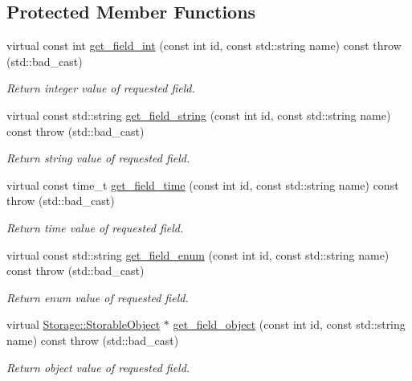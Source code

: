 \subsection*{Protected Member Functions}
\begin{DoxyCompactItemize}
\item 
virtual const int \hyperlink{classDummyStorage_a275263eba82a652005292f01a120af8e}{get\_\-field\_\-int} (const int id, const std::string name) const   throw (std::bad\_\-cast)
\begin{DoxyCompactList}\small\item\em Return integer value of requested field. \item\end{DoxyCompactList}\item 
virtual const std::string \hyperlink{classDummyStorage_a410ef9d239193e25f830c49140e18293}{get\_\-field\_\-string} (const int id, const std::string name) const   throw (std::bad\_\-cast)
\begin{DoxyCompactList}\small\item\em Return string value of requested field. \item\end{DoxyCompactList}\item 
virtual const time\_\-t \hyperlink{classDummyStorage_a978ef9d688175e3739bb478f4c9b5313}{get\_\-field\_\-time} (const int id, const std::string name) const   throw (std::bad\_\-cast)
\begin{DoxyCompactList}\small\item\em Return time value of requested field. \item\end{DoxyCompactList}\item 
virtual const std::string \hyperlink{classDummyStorage_a1101739c23fbf79b009558553180ef1a}{get\_\-field\_\-enum} (const int id, const std::string name) const   throw (std::bad\_\-cast)
\begin{DoxyCompactList}\small\item\em Return enum value of requested field. \item\end{DoxyCompactList}\item 
virtual \hyperlink{classStorage_1_1StorableObject}{Storage::StorableObject} $\ast$ \hyperlink{classDummyStorage_a7135d171d9b83c2fbf72851fa9ea852a}{get\_\-field\_\-object} (const int id, const std::string name) const   throw (std::bad\_\-cast)
\begin{DoxyCompactList}\small\item\em Return object value of requested field. \item\end{DoxyCompactList}\item 

\end{DoxyCompactItemize}
